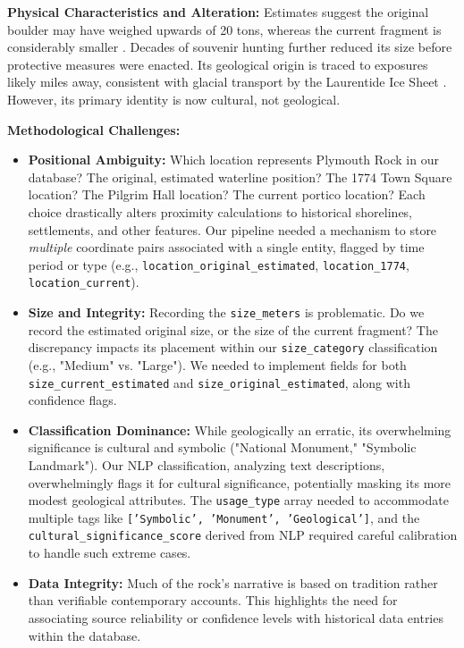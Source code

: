 \textbf{Physical Characteristics and Alteration:} Estimates suggest the original boulder may have weighed upwards of 20 tons, whereas the current fragment is considerably smaller \cite{Emerson1917}. Decades of souvenir hunting further reduced its size before protective measures were enacted. Its geological origin is traced to exposures likely miles away, consistent with glacial transport by the Laurentide Ice Sheet \cite{Emerson1917}. However, its primary identity is now cultural, not geological.

\textbf{Methodological Challenges:}
\begin{itemize}
    \item \textbf{Positional Ambiguity:} Which location represents Plymouth Rock in our database? The original, estimated waterline position? The 1774 Town Square location? The Pilgrim Hall location? The current portico location? Each choice drastically alters proximity calculations to historical shorelines, settlements, and other features. Our pipeline needed a mechanism to store \emph{multiple} coordinate pairs associated with a single entity, flagged by time period or type (e.g., \texttt{location\_original\_estimated}, \texttt{location\_1774}, \texttt{location\_current}).
    \item \textbf{Size and Integrity:} Recording the \texttt{size\_meters} is problematic. Do we record the estimated original size, or the size of the current fragment? The discrepancy impacts its placement within our \texttt{size\_category} classification (e.g., "Medium" vs. "Large"). We needed to implement fields for both \texttt{size\_current\_estimated} and \texttt{size\_original\_estimated}, along with confidence flags.
    \item \textbf{Classification Dominance:} While geologically an erratic, its overwhelming significance is cultural and symbolic ("National Monument," "Symbolic Landmark"). Our NLP classification, analyzing text descriptions, overwhelmingly flags it for cultural significance, potentially masking its more modest geological attributes. The \texttt{usage\_type} array needed to accommodate multiple tags like \texttt{['Symbolic', 'Monument', 'Geological']}, and the \texttt{cultural\_significance\_score} derived from NLP required careful calibration to handle such extreme cases.
    \item \textbf{Data Integrity:} Much of the rock's narrative is based on tradition rather than verifiable contemporary accounts. This highlights the need for associating source reliability or confidence levels with historical data entries within the database.
\end{itemize}

